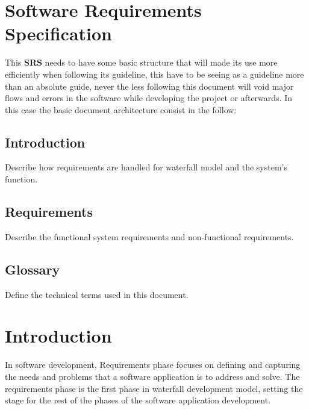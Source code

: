 \renewcommand{\headrulewidth}{0.1pt}
\renewcommand{\footrulewidth}{0.1pt}

\section*{Software Requirements Specification}

This \textbf{SRS} needs to have some basic structure that will made its use more efficiently when following its guideline, this have to be seeing as a guideline more than an absolute guide, never the less following this document will void major flows and errors in the software while developing the project or afterwards. In this case the basic document architecture consist in the follow:

\subsection*{Introduction}
Describe how requirements are handled for waterfall model and the system’s function.

\subsection*{Requirements}
Describe the functional system requirements and non-functional requirements.

\subsection*{Glossary}
Define the technical terms used in this document. 

\section*{Introduction}
In software development, Requirements phase focuses on defining and capturing the needs and problems that a software application is to address and solve. The requirements phase is the first phase in waterfall development model, setting the stage for the rest of the phases of the software application development. 


